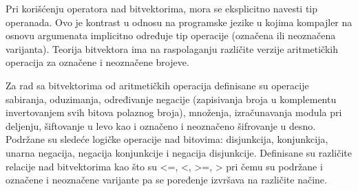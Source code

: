 \documentclass[12pt,oneside]{memoir}
\begin{document}
Pri korišćenju operatora nad bitvektorima, mora se eksplicitno navesti tip operanada. Ovo je kontrast u odnosu na programske jezike u kojima kompajler na osnovu argumenata implicitno određuje tip operacije (označena ili neoznačena varijanta).
Teorija bitvektora ima na raspolaganju različite verzije aritmetičkih operacija za označene i neoznačene brojeve. 
\par

Za rad sa bitvektorima od aritmetičkih operacija definisane su operacije sabiranja, oduzimanja, određivanje negacije (zapisivanja broja u komplementu invertovanjem svih bitova polaznog broja), množenja, izračunavanja modula pri deljenju, šiftovanje u levo kao i označeno i neoznačeno šifrovanje u desno. Podržane su sledeće logičke operacije nad bitovima: disjunkcija, konjunkcija, unarna negacija, negacija konjunkcije i negacija disjunkcije. Definisane su različite relacije nad bitvektorima kao što su <=, <, >=, > pri čemu su podržane i označene i neoznačene varijante pa se poređenje izvršava na različite načine. 
\end{document}
